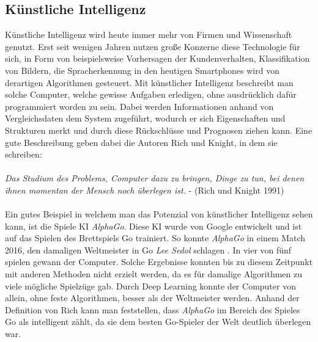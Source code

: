 \documentclass[a4paper,12pt,oneside]{article}
\begin{document}
  \subsection{Künstliche Intelligenz}\label{s.ki}
Künstliche Intelligenz wird heute immer mehr von Firmen und Wissenschaft genutzt. Erst seit wenigen Jahren nutzen große Konzerne diese Technologie für sich, in Form von beispielsweise Vorhersagen der Kundenverhalten, Klassifikation von Bildern, die Spracherkennung in den heutigen Smartphones wird von derartigen Algorithmen gesteuert. Mit künstlicher Intelligenz beschreibt man solche Computer, welche gewisse Aufgaben erledigen, ohne ausdrücklich dafür programmiert worden zu sein. Dabei werden Informationen anhand von Vergleichsdaten dem System zugeführt, wodurch er sich Eigenschaften und Strukturen merkt und durch diese Rückschlüsse und Prognosen ziehen kann. Eine gute Beschreibung geben dabei die Autoren Rich und Knight, in dem sie schreiben:\\\\
 \textit{Das Studium des Problems, Computer dazu zu bringen, Dinge zu tun, bei denen ihnen momentan der Mensch noch überlegen ist.} - (Rich und Knight 1991)\\\\
Ein gutes Beispiel in welchem man das Potenzial von künstlicher Intelligenz sehen kann, ist die Spiele KI  \textit{AlphaGo}. Diese KI wurde von Google entwickelt und ist auf das Spielen des Brettspiels Go trainiert. So konnte \textit{AlphaGo} in einem Match 2016, den damaligen Weltmeister in Go \textit{Lee Sedol} schlagen \cite{Alpha2016GO}. In vier von fünf spielen gewann der Computer. Solche Ergebnisse konnten bis zu diesem Zeitpunkt mit anderen Methoden nicht erzielt werden, da es für damalige Algorithmen zu viele mögliche Spielzüge gab. Durch Deep Learning konnte der Computer von allein, ohne feste Algorithmen, besser als der Weltmeister werden. Anhand der Definition von Rich kann man feststellen, dass  \textit{AlphaGo}  im Bereich des Spieles Go als intelligent zählt, da sie dem besten Go-Spieler der Welt deutlich überlegen war.
\end{document}
